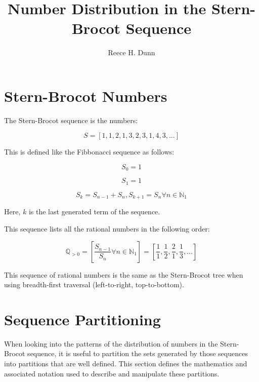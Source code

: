\documentclass{article}
\title{Number Distribution in the Stern-Brocot Sequence}
\date{}
\author{Reece H. Dunn}
\begin{document}
\maketitle

\section{Stern-Brocot Numbers}

The Stern-Brocot sequence is the numbers:

\begin{displaymath}
S = [1, 1, 2, 1, 3, 2, 3, 1, 4, 3, ...]
\end{displaymath}

\noindent
This is defined like the Fibbonacci sequence as follows:

\begin{displaymath}
S_0 = 1
\end{displaymath}

\begin{displaymath}
S_1 = 1
\end{displaymath}

\begin{displaymath}
S_k = S_{n-1} + S_n, S_{k+1} = S_n \forall n \in \mathbb{N}_1
\end{displaymath}

\noindent
Here, \begin{math}k\end{math} is the last generated term of the sequence.

\noindent
This sequence lists all the rational numbers in the following order:

\begin{displaymath}
\mathbb{Q}_{>0}
=
\left[
\frac{S_{n-1}}{S_n}
\forall n \in \mathbb{N}_{1}
\right]
=
\left[
\frac{1}{1},
\frac{1}{2},
\frac{2}{1},
\frac{1}{3},
...
\right]
\end{displaymath}

\noindent
This sequence of rational numbers is the same as the Stern-Brocot tree when
using breadth-first traversal (left-to-right, top-to-bottom).

\section{Sequence Partitioning}

When looking into the patterns of the distribution of numbers in the
Stern-Brocot sequence, it is useful to partition the sets generated by those
sequences into partitions that are well defined. This section defines the
mathematics and associated notation used to describe and manipulate these
partitions.
\end{document}
